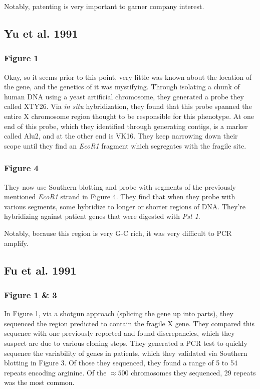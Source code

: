 \documentclass[12pt]{report}
\begin{document}
Notably, patenting is very important to garner company interest. 


\subsection{Yu et al. 1991}

\subsubsection{Figure 1}

Okay, so it seems prior to this point, very little was known about the location of the gene, and the genetics of it was mystifying. Through isolating a chunk of human DNA using a yeast artificial chromosome, they generated a probe they called XTY26. Via \textit{in situ} hybridization, they found that this probe spanned the entire X chromosome region thought to be responsible for this phenotype. At one end of this probe, which they identified through generating contigs, is a marker called Alu2, and at the other end is VK16. They keep narrowing down their scope until they find an \textit{EcoR1} fragment which segregates with the fragile site. 

\subsubsection{Figure 4}

They now use Southern blotting and probe with segments of the previously mentioned \textit{EcoR1} strand in Figure 4. They find that when they probe with various segments, some hybridize to longer or shorter regions of DNA. They're hybridizing against patient genes that were digested with \textit{Pst 1}.\newline

Notably, because this region is very G-C rich, it was very difficult to PCR amplify. 


\subsection{Fu et al. 1991}

\subsubsection{Figure 1 \& 3}

In Figure 1, via a shotgun approach (splicing the gene up into parts), they sequenced the region predicted to contain the fragile X gene. They compared this sequence with one previously reported and found discrepancies, which they suspect are due to various cloning steps. They generated a PCR test to quickly sequence the variability of genes in patients, which they validated via Southern blotting in Figure 3. Of those they sequenced, they found a range of 5 to 54 repeats encoding arginine. Of the $\approx 500$ chromosomes they sequenced, 29 repeats was the most common. 
\end{document}
